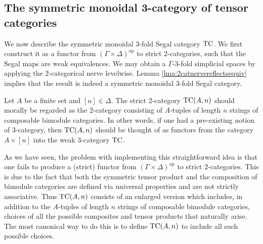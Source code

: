 \documentclass{amsart}
\begin{document}




\subsection{The symmetric monoidal 3-category of tensor categories} \label{sec-tc-threecat}


We now describe the symmetric monoidal 3-fold Segal category $\mathrm{TC}$. We first construct it as a functor from $(\Gamma \times \Delta)^\textrm{op}$ to strict 2-categories, such that the Segal maps are weak equivalences. We may obtain a $\Gamma$-3-fold simplicial spaces by applying the 2-categorical nerve levelwise. Lemma \ref{lma:2catnervereflectsequiv} implies that the result is indeed a symmetric monoidal 3-fold Segal category. 

Let $A$ be a finite set and $[n]\in \Delta$. The strict 2-category $\mathrm{TC}(A,n)$ should morally be regarded as the 2-category consisting of $A$-tuples of length $n$ strings of composable bimodule categories. In other words, if one had a pre-existing notion of 3-category, then $\mathrm{TC}(A,n)$ should be thought of as functors from the category $A \times [n]$ into the weak 3-category $\mathrm{TC}$. 

As we have seen, the problem with implementing this straightforward idea is that one fails to produce a (strict) functor from $(\Gamma \times \Delta)^\textrm{op}$ to strict $2$-categories. This is due to the fact that both the symmetric tensor product and the composition of bimodule categories are defined via universal properties and are not strictly associative. Thus $\mathrm{TC}(A,n)$ consists of an enlarged version which includes, in addition to the 
$A$-tuples of length $n$ strings of composable bimodule categories, choices of all the possible composites and tensor products that naturally arise. The most canonical way to do this is to define $\mathrm{TC}(A,n)$ to include all such possible choices. 
\end{document}
